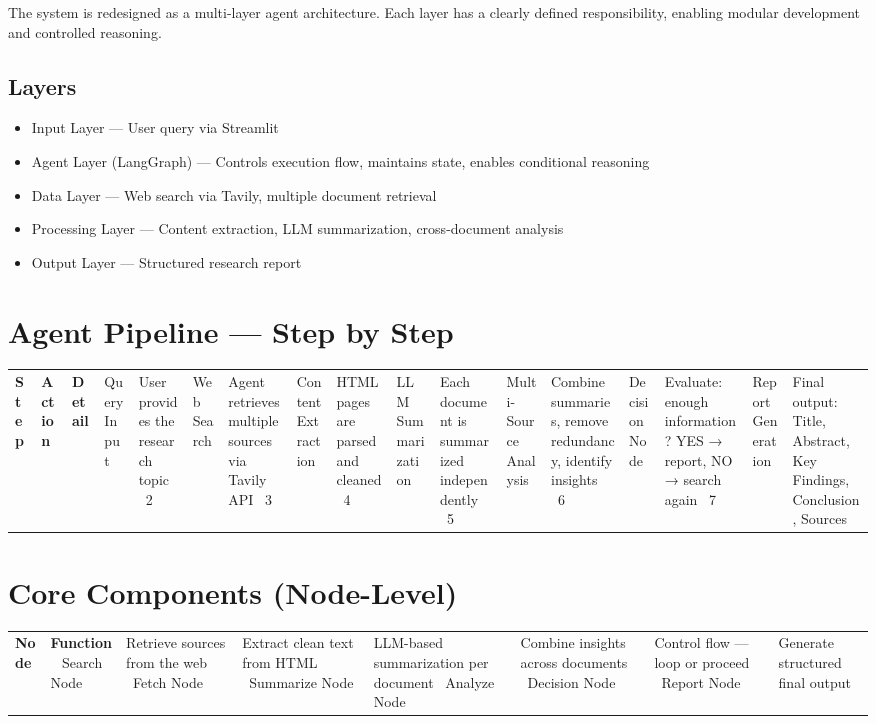 \documentclass[11pt]{article}
\begin{document}
The system is redesigned as a multi-layer agent architecture. Each layer has a clearly defined responsibility, enabling modular development and controlled reasoning.

\subsection*{Layers}
\begin{itemize}
\item Input Layer — User query via Streamlit
\item Agent Layer (LangGraph) — Controls execution flow, maintains state, enables conditional reasoning
\item Data Layer — Web search via Tavily, multiple document retrieval
\item Processing Layer — Content extraction, LLM summarization, cross-document analysis
\item Output Layer — Structured research report
\end{itemize}

\section{Agent Pipeline — Step by Step}

\begin{tabular}{lll}
\toprule
\textbf{Step} & \textbf{Action} & \textbf{Detail} \
 & Query Input & User provides the research topic \
2 & Web Search & Agent retrieves multiple sources via Tavily API \
3 & Content Extraction & HTML pages are parsed and cleaned \
4 & LLM Summarization & Each document is summarized independently \
5 & Multi-Source Analysis & Combine summaries, remove redundancy, identify insights \
6 & Decision Node & Evaluate: enough information? YES → report, NO → search again \
7 & Report Generation & Final output: Title, Abstract, Key Findings, Conclusion, Sources \
\bottomrule
\end{tabular}

\section{Core Components (Node-Level)}

\begin{tabular}{ll}
\toprule
\textbf{Node} & \textbf{Function} \
\midrule
Search Node & Retrieve sources from the web \
Fetch Node & Extract clean text from HTML \
Summarize Node & LLM-based summarization per document \
Analyze Node & Combine insights across documents \
Decision Node & Control flow — loop or proceed \
Report Node & Generate structured final output \
\bottomrule
\end{tabular}
\end{document}

